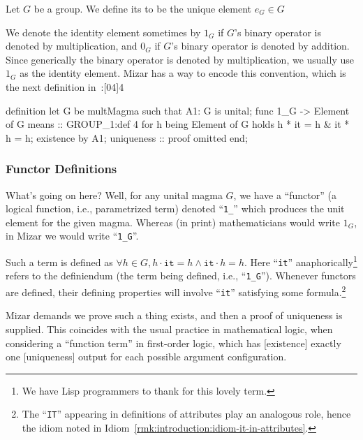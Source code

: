 \begin{definition}
Let $G$ be a group. We define its  to be the
unique element $e_{G}\in G$
\end{definition}
\begin{notation}
We denote the identity element sometimes by $1_{G}$ if $G$'s binary
operator is denoted by multiplication, and $0_{G}$ if $G$'s binary
operator is denoted by addition. Since generically the binary operator
is denoted by multiplication, we usually use $1_{G}$ as the identity element.
Mizar has a way to encode this convention, which
is the next definition in~:[04]{4}
\end{notation}


\begin{mizar}
definition
  let G be multMagma such that
A1: G is unital;
  func 1_G -> Element of G means
:: GROUP_1:def 4
  for h being Element of G
  holds h * it = h & it * h = h;
  existence by A1;
  uniqueness
  :: proof omitted
end;
\end{mizar}

\subsubsection{Functor Definitions}\label{par:introduction:functor-one-g} What's going on here? Well, for any unital magma $G$, we have a
``functor'' (a logical function, i.e., parametrized term) denoted
``\lstinline{1_}'' which produces the unit element for the given magma.
Whereas (in print) mathematicians would write $1_{G}$, in Mizar we would
write ``\lstinline{1_G}''.

Such a term is defined as $\forall h\in G, h\cdot\mathtt{it}=h\land\mathtt{it}\cdot{h}=h$.
Here ``\lstinline{it}'' anaphorically\footnote{We have
Lisp programmers to thank for this lovely term.} refers to the
definiendum (the term being defined, i.e., ``\lstinline{1_G}''). Whenever
functors are defined, their defining properties will involve
``\lstinline{it}'' satisfying some formula.\footnote{The ``\lstinline{IT}''
appearing in definitions of attributes play an analogous role, hence the
idiom noted in Idiom~\ref{rmk:introduction:idiom-it-in-attributes}.}

Mizar demands we prove such a thing exists, and then a proof of
uniqueness is supplied. This coincides with the usual practice in
mathematical logic, when considering a ``function term'' in first-order
logic, which has [existence] exactly one [uniqueness] output for each
possible argument configuration.

